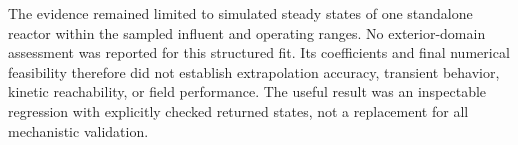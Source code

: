 The evidence remained limited to simulated steady states of one standalone reactor within the sampled influent and operating ranges. No exterior-domain assessment was reported for this structured fit. Its coefficients and final numerical feasibility therefore did not establish extrapolation accuracy, transient behavior, kinetic reachability, or field performance. The useful result was an inspectable regression with explicitly checked returned states, not a replacement for all mechanistic validation.
